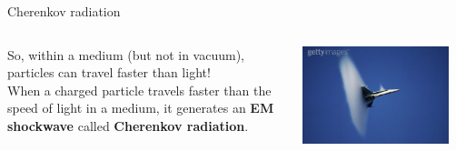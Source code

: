 \begin{frame}{Cherenkov radiation}

\begin{columns}
  \begin{column}{0.70\textwidth}
  {\small
     So, within a medium (but not in vacuum), particles can travel faster than light!\\
     When a charged particle travels faster than the speed of light in a medium,
     it generates an {\bf EM shockwave} called {\bf Cherenkov radiation}.
  }
  \end{column}
  \begin{column}{0.30\textwidth}
    \begin{center}
      \includegraphics[width=0.90\textwidth]{./images/photos/plane_breaking_sound_wave.jpg}\\
    \end{center}
  \end{column}
\end{columns}


\end{frame}
